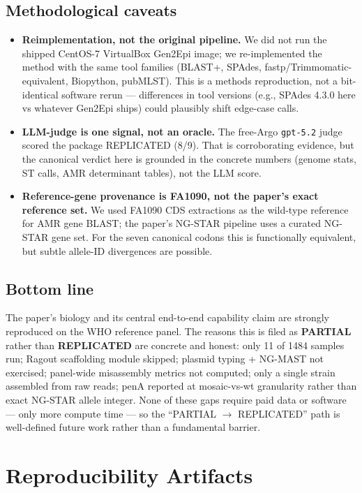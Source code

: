 \documentclass[11pt,letterpaper]{article}
\begin{document}
\subsection*{Methodological caveats}
\begin{itemize}[leftmargin=1.5em]
  \item \textbf{Reimplementation, not the original pipeline.} We did not run the shipped CentOS-7 VirtualBox Gen2Epi image; we re-implemented the method with the same tool families (BLAST+, SPAdes, fastp/Trimmomatic-equivalent, Biopython, pubMLST). This is a methods reproduction, not a bit-identical software rerun --- differences in tool versions (e.g., SPAdes 4.3.0 here vs whatever Gen2Epi ships) could plausibly shift edge-case calls.
  \item \textbf{LLM-judge is one signal, not an oracle.} The free-Argo \texttt{gpt-5.2} judge scored the package REPLICATED (8/9). That is corroborating evidence, but the canonical verdict here is grounded in the concrete numbers (genome stats, ST calls, AMR determinant tables), not the LLM score.
  \item \textbf{Reference-gene provenance is FA1090, not the paper's exact reference set.} We used FA1090 CDS extractions as the wild-type reference for AMR gene BLAST; the paper's NG-STAR pipeline uses a curated NG-STAR gene set. For the seven canonical codons this is functionally equivalent, but subtle allele-ID divergences are possible.
\end{itemize}

\subsection*{Bottom line}
The paper's biology and its central end-to-end capability claim are strongly reproduced on the WHO reference panel. The reasons this is filed as \textbf{PARTIAL} rather than \textbf{REPLICATED} are concrete and honest: only 11 of 1484 samples run; Ragout scaffolding module skipped; plasmid typing + NG-MAST not exercised; panel-wide misassembly metrics not computed; only a single strain assembled from raw reads; penA reported at mosaic-vs-wt granularity rather than exact NG-STAR allele integer. None of these gaps require paid data or software --- only more compute time --- so the ``PARTIAL $\rightarrow$ REPLICATED'' path is well-defined future work rather than a fundamental barrier.

\section{Reproducibility Artifacts}
\end{document}
